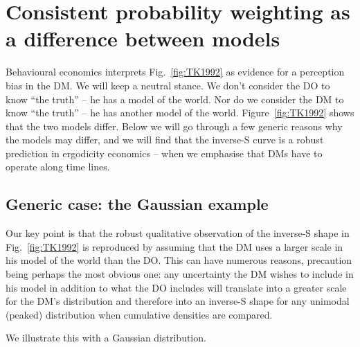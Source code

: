 \documentclass[11pt]{article}
\newcommand{\ie}{{\it i.e.}\xspace}
\newcommand{\fref}[1]{Fig.~\ref{fig:#1}}
\newcommand{\Fref}[1]{Figure~\ref{fig:#1}}
\numberwithin{equation}{section}
\begin{document}
\section{Consistent probability weighting as a difference between models}

Behavioural economics interprets \fref{TK1992} as evidence for  a perception bias in the DM. We will keep a neutral stance. We don't consider the DO to know ``the truth'' -- he has a model of the world. Nor do we consider the DM to know ``the truth'' -- he has another model of the world. \Fref{TK1992} shows that the two models differ. Below we will go through a few generic reasons why the models may differ, and we will find that the inverse-S curve is a robust prediction in ergodicity economics -- when we emphasise that DMs have to operate along time lines.


\subsection{Generic case: the Gaussian example}
Our key point is that the robust qualitative observation of the inverse-S shape in \fref{TK1992} is reproduced by assuming that the DM uses a larger scale in his model of the world than the DO. This can have numerous reasons, precaution being perhaps the most obvious one: any uncertainty the DM wishes to include in his model in addition to what the DO includes will translate into a greater scale for the DM's distribution and therefore into an inverse-S shape for any unimodal (peaked) distribution when cumulative densities are compared.

We illustrate this with a Gaussian distribution.

%
%
\end{document}

